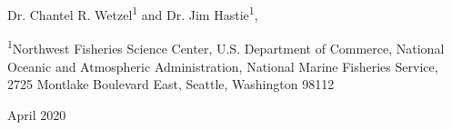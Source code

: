 
\begin{center}
\thispagestyle{empty}

\vspace{.5cm}


Dr. Chantel R. Wetzel\textsuperscript{1} and Dr. Jim Hastie\textsuperscript{1}, \\


\vspace{.5cm}

\small
\textsuperscript{1}Northwest Fisheries Science Center, U.S. Department of Commerce, National Oceanic and Atmospheric Administration, National Marine Fisheries Service, 2725 Montlake Boulevard East, Seattle, Washington 98112\\



\vspace{1.5cm}


\vfill
April 2020

\vspace{1cm}


\vspace{.3cm}

\end{center}

\newpage



\maketitle


\setcounter{page}{1}



